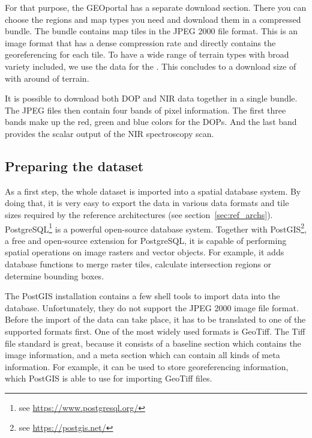 For that purpose, the GEOportal has a separate download section. There you can choose the regions and map types you need and download them in a compressed bundle. The bundle contains map tiles in the JPEG 2000 file format. This is an image format that has a dense compression rate and directly contains the georeferencing for each tile. To have a wide range of terrain types with broad variety included, we use the data for the . This concludes to a download size of  with around  of terrain.

It is possible to download both DOP and NIR data together in a single bundle. The JPEG files then contain four bands of pixel information. The first three bands make up the red, green and blue colors for the DOPs. And the last band provides the scalar output of the NIR spectroscopy scan.



\subsection{Preparing the dataset}
As a first step, the whole dataset is imported into a spatial database system. By doing that, it is very easy to export the data in various data formats and tile sizes required by the reference architectures (see section~\ref{sec:ref_archs}). PostgreSQL\footnote{see \url{https://www.postgresql.org/}} is a powerful open-source database system. Together with PostGIS\footnote{see \url{https://postgis.net/}}, a free and open-source extension for PostgreSQL, it is capable of performing spatial operations on image rasters and vector objects. For example, it adds database functions to merge raster tiles, calculate intersection regions or determine bounding boxes.

The PostGIS installation contains a few shell tools to import data into the database. Unfortunately, they do not support the JPEG 2000 image file format. Before the import of the data can take place, it has to be translated to one of the supported formats first. One of the most widely used formats is GeoTiff. The Tiff file standard is great, because it consists of a baseline section which contains the image information, and a meta section which can contain all kinds of meta information. For example, it can be used to store georeferencing information, which PostGIS is able to use for importing GeoTiff files.

